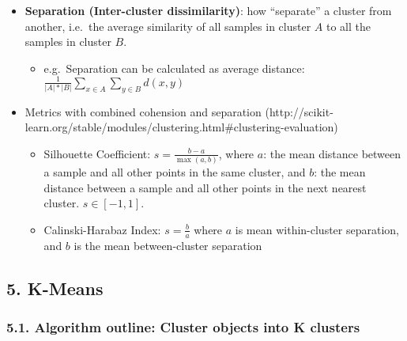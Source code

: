 \documentclass[11pt]{article}
\providecommand{\tightlist}{%
      \setlength{\itemsep}{0pt}\setlength{\parskip}{0pt}}
\begin{document}
\begin{itemize}
\tightlist
\item
  \textbf{Separation (Inter-cluster dissimilarity)}: how ``separate'' a
  cluster from another, i.e.~the average similarity of all samples in
  cluster \(A\) to all the samples in cluster \(B\).

  \begin{itemize}
  \tightlist
  \item
    e.g.~Separation can be calculated as average distance:
    \(\frac{1}{|A|*|B|}\sum_{x \in A}{\sum_{y \in B}{d(x, y)}}\)
  \end{itemize}
\item
  Metrics with combined cohension and separation
  (http://scikit-learn.org/stable/modules/clustering.html\#clustering-evaluation)

  \begin{itemize}
  \tightlist
  \item
    Silhouette Coefficient: \(s=\frac{b-a}{\max(a,b)}\), where \(a\):
    the mean distance between a sample and all other points in the same
    cluster, and \(b\): the mean distance between a sample and all other
    points in the next nearest cluster. \(s \in [-1, 1]\).
  \item
    Calinski-Harabaz Index: \(s=\frac{b}{a}\) where \(a\) is mean
    within-cluster separation, and \(b\) is the mean between-cluster
    separation
  \end{itemize}
\end{itemize}

    \hypertarget{k-means}{%
\subsection{5. K-Means}\label{k-means}}

\hypertarget{algorithm-outline-cluster-objects-into-k-clusters}{%
\subsubsection{5.1. Algorithm outline: Cluster objects into K
clusters}\label{algorithm-outline-cluster-objects-into-k-clusters}}
\end{document}
